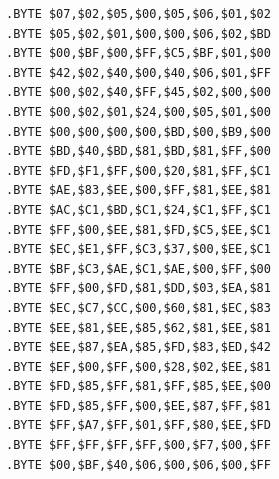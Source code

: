 \begin{minipage}[b]{0.33\linewidth}
\begin{lrbox}{\mybox}
\begin{lstlisting}[basicstyle=\ttfamily\tiny]
.BYTE $07,$02,$05,$00,$05,$06,$01,$02
.BYTE $05,$02,$01,$00,$00,$06,$02,$BD
.BYTE $00,$BF,$00,$FF,$C5,$BF,$01,$00
.BYTE $42,$02,$40,$00,$40,$06,$01,$FF
.BYTE $00,$02,$40,$FF,$45,$02,$00,$00
.BYTE $00,$02,$01,$24,$00,$05,$01,$00
.BYTE $00,$00,$00,$00,$BD,$00,$B9,$00
.BYTE $BD,$40,$BD,$81,$BD,$81,$FF,$00
.BYTE $FD,$F1,$FF,$00,$20,$81,$FF,$C1
.BYTE $AE,$83,$EE,$00,$FF,$81,$EE,$81
.BYTE $AC,$C1,$BD,$C1,$24,$C1,$FF,$C1
.BYTE $FF,$00,$EE,$81,$FD,$C5,$EE,$C1
.BYTE $EC,$E1,$FF,$C3,$37,$00,$EE,$C1
.BYTE $BF,$C3,$AE,$C1,$AE,$00,$FF,$00
.BYTE $FF,$00,$FD,$81,$DD,$03,$EA,$81
.BYTE $EC,$C7,$CC,$00,$60,$81,$EC,$83
.BYTE $EE,$81,$EE,$85,$62,$81,$EE,$81
.BYTE $EE,$87,$EA,$85,$FD,$83,$ED,$42
.BYTE $EF,$00,$FF,$00,$28,$02,$EE,$81
.BYTE $FD,$85,$FF,$81,$FF,$85,$EE,$00
.BYTE $FD,$85,$FF,$00,$EE,$87,$FF,$81
.BYTE $FF,$A7,$FF,$01,$FF,$80,$EE,$FD
.BYTE $FF,$FF,$FF,$FF,$00,$F7,$00,$FF
.BYTE $00,$BF,$40,$06,$00,$06,$00,$FF
\end{lstlisting}
\end{lrbox}%
\scalebox{0.8}{\usebox{\mybox}}
\end{minipage}
